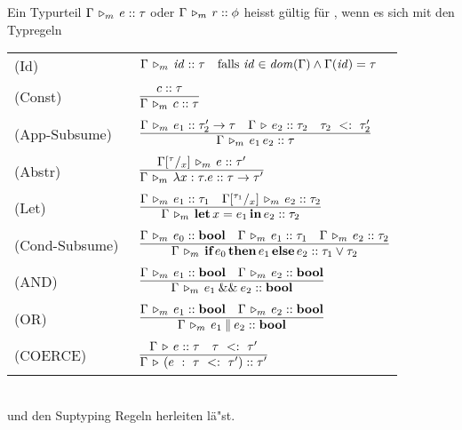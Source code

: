   Ein Typurteil $\Gamma\,\triangleright_m\,e\mathrel{::}\tau$ oder $\Gamma\,\triangleright_m\,r\mathrel{::}\phi$ heisst g\"ultig f\"ur \Lom,
  wenn es sich mit den Typregeln  \\[5mm]
  \begin{tabular}{ll} 
    \mbox{(Id)\ }           & $\Gamma\,\triangleright_m\,{\text{\it id\/}}\mathrel{::}\tau \quad \text{falls } {\text{\it id\/}}\in{\text{\it dom\/}}(\Gamma) \wedge \Gamma({\text{\it id\/}}) = \tau$ \\[1mm]
    \mbox{(Const)\ }        & $\RULE{\tj{c}{\tau}}
                              {\Tjm{\Gamma}{c}{\tau}}$ \\[4mm]
    \mbox{(App-Subsume)\ }  & $\RULE{\Tjm{\Gamma}{e_1}{\typeArrow{\tau_2'}{\tau}}
                               \quad
                               \Tj{\Gamma}{e_2}{\tau_2}
                               \quad
                               \subtype{\tau_2} {\tau_2'}}
                              {\Tjm{\Gamma}{\expApp{e_1}{e_2}}{\tau}}$ \\[4mm]
    \mbox{(Abstr)\ }        & $\RULE{\Tjm{\Gamma\SUB{\tau}{x}}{e}{\tau'}}
                              {\Tjm{\Gamma}{\expAbstr{x:\tau}{e}}{\typeArrow{\tau}{\tau'}}}$ \\[4mm]
    \mbox{(Let)\ }          & $\RULE{\Tjm{\Gamma}{e_1}{\tau_1}
                               \quad
                               \Tjm{\Gamma\SUB{\tau_1}{x}}{e_2}{\tau_2}}
                              {\Tjm{\Gamma}{\expLet{x}{e_1}{e_2}}{\tau_2}}$ \\[4mm]
   \mbox{(Cond-Subsume)\ } & $\RULE{\Tjm{\Gamma}{e_0}{\bool}
                               \quad
                               \Tjm{\Gamma}{e_1}{\tau_1}
                               \quad
                               \Tjm{\Gamma}{e_2}{\tau_2}}
                              {\Tjm{\Gamma}{\expCond{e_0}{e_1}{e_2}}{\tau_1 \vee \tau_2}}$ \\[4mm]
  \mbox{(AND)\ } & $\regel{\Tjm{\Gamma}{e_1}{\bool} \quad \Tjm{\Gamma}{e_2}{\bool}}
                          {\Tjm{\Gamma}{\andalso{e_1}{e_2}}{\bool}}$ \\[4mm]
  \mbox{(OR)\  } & $\regel{\Tjm{\Gamma}{e_1}{\bool} \quad \Tjm{\Gamma}{e_2}{\bool}}
                          {\Tjm{\Gamma}{\orelse{e_1}{e_2}}{\bool}}$\\[4mm]
   \mbox{(COERCE)\ } & $\regel{\Tj{\Gamma}{e}{\tau} \quad \subtype{\tau}{\tau'}} 
                          {\Tj{\Gamma}{\coercion{e}{\tau}{\tau'}}{\tau'}}$
   
  \end{tabular} \\[7mm]
  und den Suptyping Regeln herleiten l\"a"st.




